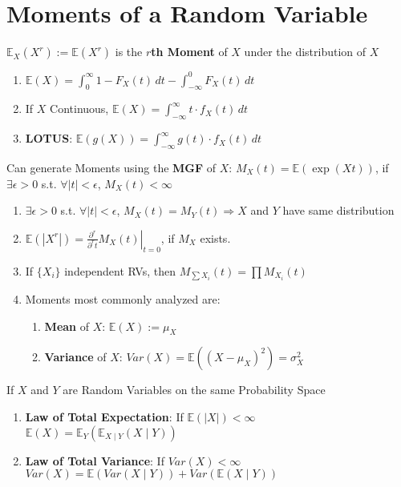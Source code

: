 \documentclass[a4paper,portrait,columns=2]{cheatsheet}
\begin{document}
\section{Moments of a Random Variable}
\(\mathbb{E}_X(X^r) := \mathbb{E}(X^r)\) is the \textbf{\(r\)th Moment} of \(X\) under the distribution of \(X\)
\begin{enumerate}
	\item \(\mathbb{E}(X) = \int_0^\infty 1 - F_X(t)\,dt - \int_{-\infty}^0 F_X(t)\,dt\)
	\item If \(X\) Continuous, \(\mathbb{E}(X) = \int_{-\infty}^{\infty} t \cdot f_X(t)\,dt\)
	\item \textbf{LOTUS}: \(\mathbb{E}(g(X)) = \int_{-\infty}^{\infty} g(t) \cdot f_X(t)\,dt\)
\end{enumerate}
Can generate Moments using the \textbf{MGF} of \(X\): \( M_X(t) = \mathbb{E} \left(\exp(Xt) \right) \), if \( \exists \epsilon >0 \) s.t. \( \forall |t| < \epsilon\),  \(M_X(t) < \infty \)
\begin{enumerate}
	\item \( \exists \epsilon >0 \) s.t. \( \forall |t| < \epsilon\),  \(M_X(t) = M_Y(t) \Rightarrow X\) and \(Y\) have same distribution
	\item \(\mathbb{E}(|X^r|) = \left.\frac{\partial^r}{\partial^r t}M_X(t)\right\rvert_{t=0}\), if \(M_X\) exists.
	\item If \(\{ X_i\}\) independent RVs, then \( M_{\sum X_i} (t) = \prod M_{X_i}(t)\)
	\item Moments most commonly analyzed are:
	\begin{enumerate}
		\item \textbf{Mean} of \(X\): \(\mathbb{E}(X):=\mu_X\)
		\item \textbf{Variance} of \(X\): \(Var(X)=\mathbb{E}((X-\mu_{X})^2)=\sigma^2_{X}\)
	\end{enumerate}
\end{enumerate}
If \(X\) and \(Y\) are Random Variables on the same Probability Space
\begin{enumerate}
	\item \textbf{Law of Total Expectation}: If \(\mathbb{E}(|X|)<\infty\) \(\mathbb{E}(X)=\mathbb{E}_{Y}(\mathbb{E}_{X \mid Y}(X \mid Y))\)
	\item \textbf{Law of Total Variance}: If \(Var(X)<\infty\)
	\(Var(X)=\mathbb{E}(Var(X \mid Y))+Var(\mathbb{E}(X \mid Y))\)

\end{enumerate}
\end{document}
